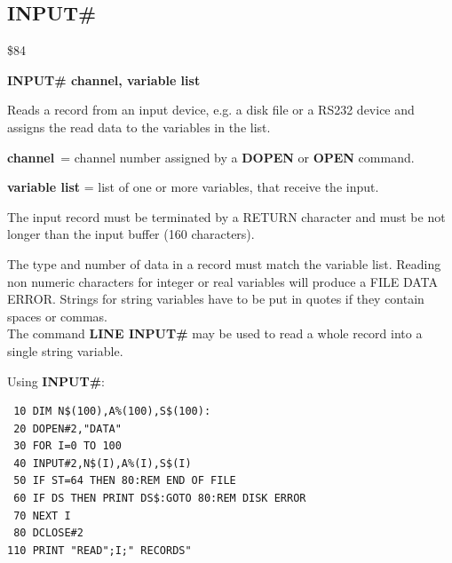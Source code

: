 
\newpage
\subsection{INPUT\#}
\begin{description}[leftmargin=2cm,style=nextline]
\item [Token:] \$84
\item [Format:] {\bf INPUT\# channel, variable list}
\item [Usage:] Reads a record
               from an input device, e.g. a disk file
               or a RS232 device and assigns the read data
               to the variables in the list.

               {\bf channel} = channel number assigned
               by a {\bf DOPEN} or {\bf OPEN} command.

               {\bf variable list} = list of one or more
               variables, that receive the input.

               The input record must be terminated by a
               RETURN character and must be not longer than
               the input buffer (160 characters).

\item [Remarks:] The type and number of data in a record must
               match the variable list.
               Reading non numeric characters for integer or real
               variables will produce a FILE DATA ERROR.
               Strings for string variables have to be put in quotes
               if they contain spaces or commas. \\
               The command {\bf LINE INPUT\#} may be used to
               read a whole record into a single string variable.

\item [Example:] Using {\bf INPUT\#}:
\begin{tcolorbox}[colback=black,coltext=white]
\verbatimfont{\codefont}
\begin{verbatim}
 10 DIM N$(100),A%(100),S$(100):
 20 DOPEN#2,"DATA"
 30 FOR I=0 TO 100
 40 INPUT#2,N$(I),A%(I),S$(I)
 50 IF ST=64 THEN 80:REM END OF FILE
 60 IF DS THEN PRINT DS$:GOTO 80:REM DISK ERROR
 70 NEXT I
 80 DCLOSE#2
110 PRINT "READ";I;" RECORDS"
\end{verbatim}
\end{tcolorbox}
\end{description}

